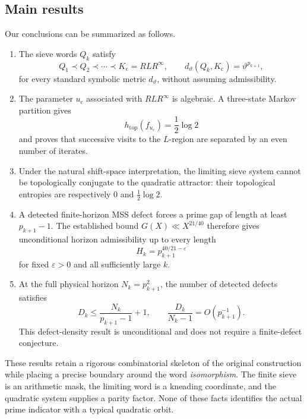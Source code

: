 \documentclass[11pt]{article}
\theoremstyle{definition}
\theoremstyle{remark}
\newcommand{\eps}{\varepsilon}
\newcommand{\uc}{u_{\mathrm c}}
\newcommand{\Kc}{K_{\mathrm c}}
\begin{document}
\subsection*{Main results}

Our conclusions can be summarized as follows.

\begin{enumerate}[label=\textbf{R\arabic*.},leftmargin=3.2em]
    \item The sieve words $Q_k$ satisfy
    \[
        Q_1\prec Q_2\prec\cdots\prec \Kc=RLR^\infty,
        \qquad d_\vartheta(Q_k,\Kc)=\vartheta^{p_{k+1}},
    \]
    for every standard symbolic metric $d_\vartheta$, without assuming admissibility.

    \item The parameter $\uc$ associated with $RLR^\infty$ is algebraic.  A three-state Markov partition gives
    \[
        h_{\mathrm{top}}(f_{\uc})=\frac12\log 2
    \]
    and proves that successive visits to the $L$-region are separated by an even number of iterates.

    \item Under the natural shift-space interpretation, the limiting sieve system cannot be topologically conjugate to the quadratic attractor: their topological entropies are respectively $0$ and $\frac12\log2$.

    \item A detected finite-horizon MSS defect forces a prime gap of length at least $p_{k+1}-1$.  The established bound $G(X)\ll X^{21/40}$ therefore gives unconditional horizon admissibility up to every length
    \[
        H_k=p_{k+1}^{40/21-\eps}
    \]
    for fixed $\eps>0$ and all sufficiently large $k$.

    \item At the full physical horizon $N_k=p_{k+1}^2$, the number of detected defects satisfies
    \[
        D_k\le \frac{N_k}{p_{k+1}-1}+1,
        \qquad \frac{D_k}{N_k-1}=O(p_{k+1}^{-1}).
    \]
    This defect-density result is unconditional and does not require a finite-defect conjecture.
\end{enumerate}

These results retain a rigorous combinatorial skeleton of the original construction while placing a precise boundary around the word \emph{isomorphism}.  The finite sieve is an arithmetic mask, the limiting word is a kneading coordinate, and the quadratic system supplies a parity factor.  None of these facts identifies the actual prime indicator with a typical quadratic orbit.
\end{document}
